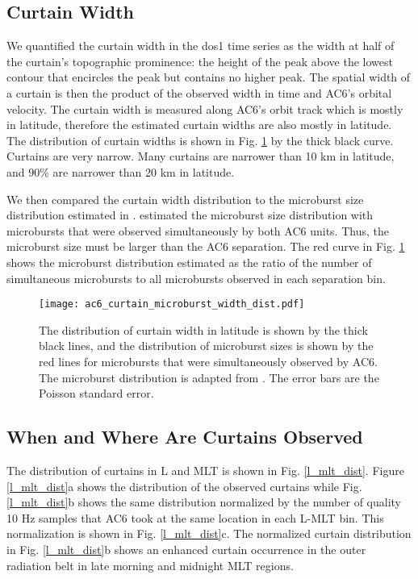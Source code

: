 \documentclass[draft]{agujournal2019}
\begin{document}
\subsection{Curtain Width}
We quantified the curtain width in the dos1 time series as the width at half of the curtain's topographic prominence: the height of the peak above the lowest contour that encircles the peak but contains no higher peak. The spatial width of a curtain is then the product of the observed width in time and AC6's orbital velocity. The curtain width is measured along AC6's orbit track which is mostly in latitude, therefore the estimated curtain widths are also mostly in latitude. The distribution of curtain widths is shown in Fig. \ref{width_dist} by the thick black curve. Curtains are very narrow. Many curtains are narrower than 10 km in latitude, and 90\% are narrower than 20 km in latitude.
	
We then compared the curtain width distribution to the microburst size distribution estimated in .  estimated the microburst size distribution with microbursts that were observed simultaneously by both AC6 units. Thus, the microburst size must be larger than the AC6 separation. The red curve in Fig. \ref{width_dist} shows the microburst distribution estimated as the ratio of the number of simultaneous microbursts to all microbursts observed in each separation bin. 

\begin{figure}
\texttt{[image: ac6\_curtain\_microburst\_width\_dist.pdf]}
\caption{The distribution of curtain width in latitude is shown by the thick black lines, and the distribution of microburst sizes is shown by the red lines for microbursts that were simultaneously observed by AC6. The microburst distribution is adapted from . The error bars are the Poisson standard error.}
\label{width_dist}
\end{figure}

\subsection{When and Where Are Curtains Observed}
The distribution of curtains in L and MLT is shown in Fig. \ref{l_mlt_dist}. Figure \ref{l_mlt_dist}a shows the distribution of the observed curtains while Fig. \ref{l_mlt_dist}b shows the same distribution normalized by the number of quality 10 Hz samples that AC6 took at the same location in each L-MLT bin. This normalization is shown in Fig. \ref{l_mlt_dist}c. The normalized curtain distribution in Fig. \ref{l_mlt_dist}b shows an enhanced curtain occurrence in the outer radiation belt in late morning and midnight MLT regions.
\end{document}

